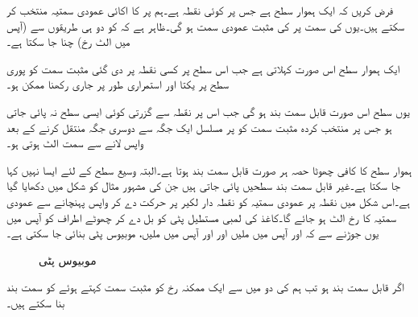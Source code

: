 فرض کریں کہ  ایک ہموار سطح ہے جس پر  کوئی نقطہ ہے۔ہم  پر  کا اکائی عمودی سمتیہ  منتخب کر سکتے ہیں۔یوں  کی سمت  پر  کی مثبت عمودی سمت  ہو گی۔ظاہر ہے کہ  کو دو ہی  طریقوں سے (آپس میں الٹ رخ) چنا جا سکتا ہے۔  

ایک ہموار سطح اس صورت  کہلاتی ہے جب اس سطح پر کسی نقطہ  پر دی  گئی مثبت سمت کو پوری سطح پر یکتا اور استمراری طور پر جاری رکھنا ممکن ہو۔

یوں سطح  اس صورت قابل سمت بند ہو گی جب اس پر نقطہ  سے گزرتی کوئی ایسی سطح  نہ پائی جاتی ہو جس پر منتخب کردہ مثبت سمت کو  پر مسلسل ایک جگہ سے دوسری جگہ منتقل کرنے کے بعد واپس  لانے سے سمت الٹ ہوتی ہو۔    

ہموار سطح کا کافی چھوٹا حصہ ہر صورت قابل سمت بند ہوتا ہے۔البتہ وسیع سطح کے لئے ایسا نہیں کہا جا سکتا ہے۔غیر قابل سمت بند سطحیں پائی جاتی ہیں جن کی مشہور مثال  کو شکل  میں دکھایا گیا ہے۔اس شکل میں نقطہ  پر عمودی سمتیہ کو نقطہ دار لکیر پر  حرکت دے کر  واپس  پہنچانے سے  عمودی سمتیہ کا رخ الٹ ہو جائے گا۔کاغذ کی لمبی مستطیل پٹی کو بل دے کر چھوٹے اطراف کو آپس میں یوں جوڑنے سے کہ  اور  آپس میں ملیں اور  اور  آپس میں ملیں، موبیوس پٹی بنائی جا سکتی ہے۔
\begin{figure}
\centering
\begin{subfigure}{0.5\textwidth}
\centering
{}%
\end{subfigure}%
\begin{subfigure}{0.5\textwidth}
\centering
{}
\end{subfigure}%
\caption{موبیوس پٹی}
\label{شکل_خطی_تکمل_موبیوس_پٹی}
\end{figure}
اگر  قابل سمت بند ہو تب ہم  کی دو میں سے ایک ممکنہ رخ کو مثبت سمت کہتے ہوئے  کو سمت بند بنا سکتے ہیں۔

